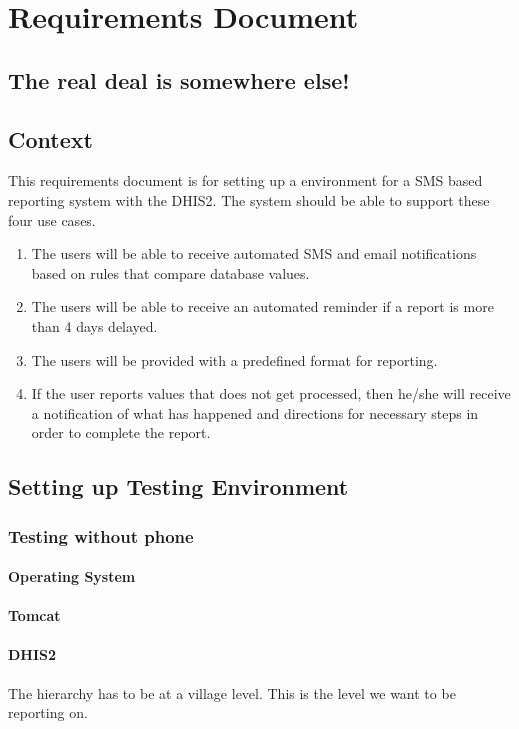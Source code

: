 \chapter{Requirements Document}
\section{The real deal is somewhere else!}
\section{Context}
This requirements document is for setting up a environment for a SMS based reporting system with the DHIS2. The system should be able to support these four use cases.

\begin{enumerate}
	\item The users will be able to receive automated SMS and email notifications based on rules that compare database values.
	\item The users will be able to receive an automated reminder if a report is more than 4 days delayed.
	\item The users will be provided with a predefined format for reporting.
	\item If the user reports values that does not get processed, then he/she will receive a notification of what has happened and directions for necessary steps in order to complete the report.
\end{enumerate} 

\section{Setting up Testing Environment}

\subsection{Testing without phone}
\subsubsection{Operating System}
\subsubsection{Tomcat}
\subsubsection{DHIS2}
The hierarchy has to be at a village level. This is the level we want to be reporting on.
